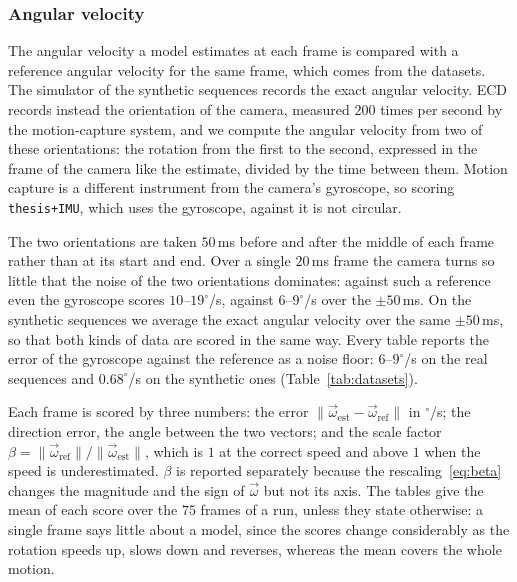 \documentclass[journal]{IEEEtran}
\newcommand{\wvec}{\vec{\omega}}
\begin{document}

\subsubsection{Angular velocity}
The angular velocity a model estimates at each frame is compared with a
reference angular velocity for the same frame, which comes from the datasets.
The simulator of the synthetic sequences records the exact angular velocity.
ECD records instead the orientation of the camera, measured $200$ times per
second by the motion-capture system, and we compute the angular velocity from
two of these orientations: the rotation from the first to the second, expressed
in the frame of the camera like the estimate, divided by the time between them.
Motion capture is a different instrument from the camera's gyroscope, so scoring
\texttt{thesis+IMU}, which uses the gyroscope, against it is not circular.

The two orientations are taken $50$\,ms before and after the middle of each
frame rather than at its start and end. Over a single $20$\,ms frame the camera
turns so little that the noise of the two orientations dominates: against such a
reference even the gyroscope scores $10$--$19^\circ$/s, against $6$--$9^\circ$/s
over the $\pm50$\,ms. On the synthetic sequences we average the exact angular
velocity over the same $\pm50$\,ms, so that both kinds of data are scored in the
same way. Every table reports the error of the gyroscope against the reference
as a noise floor: $6$--$9^\circ$/s on the real sequences and $0.68^\circ$/s on
the synthetic ones (Table~\ref{tab:datasets}).

Each frame is scored by three numbers: the error
$\|\wvec_{\text{est}}-\wvec_{\text{ref}}\|$ in $^\circ$/s; the direction error,
the angle between the two vectors; and the scale factor
$\beta = \|\wvec_{\text{ref}}\| / \|\wvec_{\text{est}}\|$, which is $1$ at the
correct speed and above $1$ when the speed is underestimated. $\beta$ is
reported separately because the rescaling~\eqref{eq:beta} changes the magnitude
and the sign of $\wvec$ but not its axis. The tables give the mean of each score
over the $75$ frames of a run, unless they state otherwise: a single frame says
little about a model, since the scores change considerably as the rotation
speeds up, slows down and reverses, whereas the mean covers the whole motion.
\end{document}
